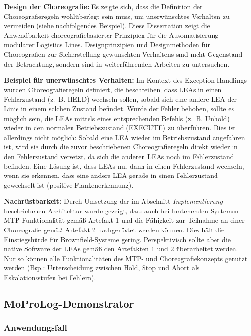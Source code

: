\textbf{Design der Choreografie:} Es zeigte sich, dass die Definition der Choreografieregeln wohlüberlegt sein muss, um unerwünschtes Verhalten zu vermeiden (siehe nachfolgendes Beispiel). Diese Dissertation zeigt die Anwendbarkeit choreografiebasierter Prinzipien für die Automatisierung modularer Logistics Lines. Designprinzipien und Designmethoden für Choreografien zur Sicherstellung gewünschten Verhaltens sind nicht Gegenstand der Betrachtung, sondern sind in weiterführenden Arbeiten zu untersuchen.

\begin{graybox}
	\textbf{Beispiel für unerwünschtes Verhalten:} Im Kontext des Exception Handlings wurden Choreografieregeln definiert, die beschreiben, dass LEAs in einen Fehlerzustand (z.~B. HELD) wechseln sollen, sobald sich eine andere LEA der Linie in einem solchen Zustand befindet. Wurde der Fehler behoben, sollte es möglich sein, die LEAs mittels eines entsprechenden Befehls (z.~B. Unhold) wieder in den normalen Betriebszustand (EXECUTE) zu überführen. Dies ist allerdings nicht möglich: Sobald eine LEA wieder im Betriebszustand angefahren ist, wird sie durch die zuvor beschriebenen Choreografieregeln direkt wieder in den Fehlerzustand versetzt, da sich die anderen LEAs noch im Fehlerzustand befinden. Eine Lösung ist, dass LEAs nur dann in einen Fehlerzustand wechseln, wenn sie erkennen, dass eine andere LEA gerade in einen Fehlerzustand gewechselt ist (positive Flankenerkennung).  
\end{graybox}

\textbf{Nachrüstbarkeit:} Durch Umsetzung der im Abschnitt \emph{Implementierung} beschriebenen Architektur wurde gezeigt, dass auch bei bestehenden Systemen MTP-Funktionalität gemäß Artefakt 1 und die Fähigkeit zur Teilnahme an einer Choreografie gemäß Artefakt 2 nachgerüstet werden können. Dies hält die Einstiegshürde für Brownfield-Systeme gering. Perspektivisch sollte aber die native Software der LEAs gemäß den Artefakten 1 und 2 überarbeitet werden. Nur so können alle Funktionalitäten des MTP- und Choreografiekonzepts genutzt werden (Bsp.: Unterscheidung zwischen Hold, Stop und Abort als Eskalationsstufen bei Fehlern).

\subsection{MoProLog-Demonstrator}
\label{subsec:EvaluationsBeispielMoProLog}

\subsubsection{Anwendungsfall}


